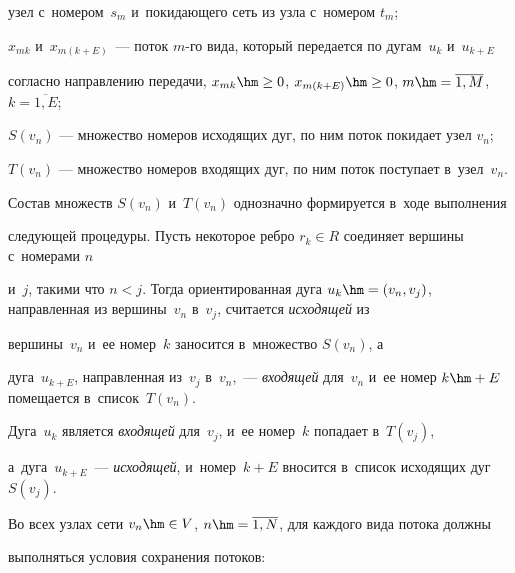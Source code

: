 узел с~номером~$s_m$ и~по\-ки\-да\-юще\-го сеть из узла с~номером $t_m$;


$x_{mk}$ и~$x_{m(k + E)}$~---  поток $m$-го вида, который передается по дугам~$u_k$ и~$u_{k + E}$ 


согласно на\-прав\-ле\-нию передачи, $x_{mk} \hm\ge 0$, $x_{m(k + 


E)}\hm\ge 0$, $m \hm= \overline{1, M}$, $k = \overline {1, E}$;


$S(v_n)$ --- множество номеров исходящих дуг, по ним поток покидает узел $v_n$;


$T(v_n)$ --- множество номеров входящих дуг, по ним поток поступает в~узел~$v_n$.





Состав множеств $S(v_n)$ и~$T(v_n)$ однозначно формируется в~ходе выполнения 


следующей процедуры. Пусть некоторое ребро $r_k \in R$ соединяет вершины с~номерами $n$


 и~$j$, такими что $n < j$. Тогда ориентированная дуга $u_k \hm= (v_n, 


v_j)$, направленная из вершины~$v_n$ в~$v_j$, считается \textit{исходящей} из 


вершины~$v_{n}$ и~ее номер~$k$ заносится в~множество $S(v_n)$, а


дуга~$u_{k+E}$, направленная из~$v_j$ в~$v_n$,~--- \textit{входящей} для~$v_{n}$ и~ее номер $k\hm+E$ помещается в~список~$T(v_n)$.


Дуга~$u_k$ является \textit{входящей} для~$v_j$, и~ее номер~$k$ попадает в~$T(v_j)$,


 а~дуга~$u_{k+E}$~--- \textit{исходящей}, и~номер~$k+E$ вносится в~список исходящих дуг~$S(v_j)$.





Во всех узлах сети $v_n \hm\in V$, $n \hm= \overline{1,N}$,  для каждого вида потока долж\-ны 


выполняться условия сохранения потоков:





\vspace*{-6pt}





\noindent


